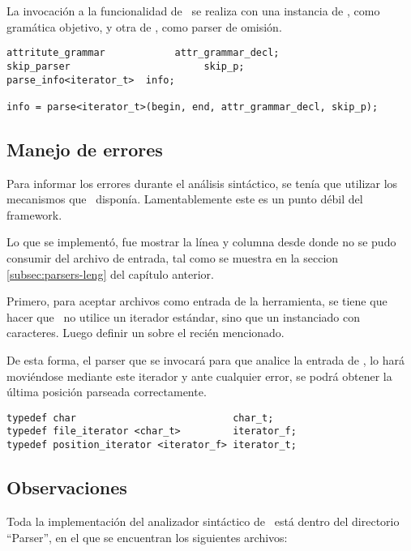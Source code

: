 La invocación a la funcionalidad de \spirit\ se realiza con una instancia de , como gramática objetivo, y otra de , como parser de omisión.

\begin{lstlisting}[columns=fullflexible, linewidth=12cm]
attritute_grammar            attr_grammar_decl;
skip_parser                       skip_p;
parse_info<iterator_t>  info;

info = parse<iterator_t>(begin, end, attr_grammar_decl, skip_p);
\end{lstlisting}

\subsection{Manejo de errores}

Para informar los errores durante el análisis sintáctico, se tenía que utilizar los mecanismos que \spirit\ disponía. Lamentablemente este es un punto débil del framework.

Lo que se implementó, fue mostrar la línea y columna desde donde no se pudo consumir del archivo de entrada, tal como se muestra en la seccion \ref{subsec:parsers-leng} del capítulo anterior.

Primero, para aceptar archivos como entrada de la herramienta, se tiene que hacer que \spirit\ no utilice un iterador estándar, sino que un  instanciado con caracteres. Luego definir un  sobre el recién mencionado.

De esta forma, el parser que se invocará para que analice la entrada de \maggen, lo hará moviéndose mediante este iterador y ante cualquier error, se podrá obtener la última posición parseada correctamente.

\begin{lstlisting}[linewidth=10cm]
typedef char                           char_t;
typedef file_iterator <char_t>         iterator_f;
typedef position_iterator <iterator_f> iterator_t;
\end{lstlisting}

\subsection{Observaciones}

Toda la implementación del analizador sintáctico de \maggen\ está dentro del directorio ``Parser'', en el que se encuentran los siguientes archivos:

